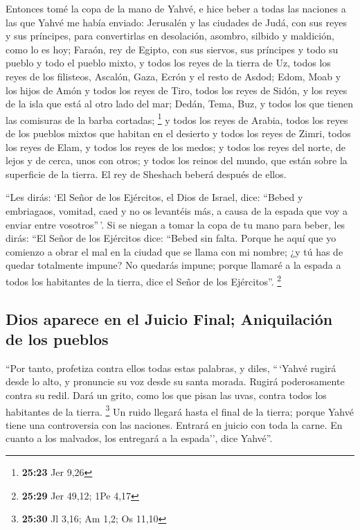 \begin{paracol}{2}
 Entonces tomé la copa de la mano de Yahvé, e hice beber
a todas las naciones a las que Yahvé me había enviado: 
Jerusalén y las ciudades de Judá, con sus reyes y sus príncipes, para
convertirlas en desolación, asombro, silbido y maldición, como lo es
hoy;  Faraón, rey de Egipto, con sus siervos, sus
príncipes y todo su pueblo  y todo el pueblo mixto, y
todos los reyes de la tierra de Uz, todos los reyes de los filisteos,
Ascalón, Gaza, Ecrón y el resto de Asdod;  Edom, Moab y
los hijos de Amón  y todos los reyes de Tiro, todos los
reyes de Sidón, y los reyes de la isla que está al otro lado del mar;
 Dedán, Tema, Buz, y todos los que tienen las comisuras
de la barba cortadas; \footnote{\textbf{25:23} Jer 9,26} 
y todos los reyes de Arabia, todos los reyes de los pueblos mixtos que
habitan en el desierto  y todos los reyes de Zimri, todos
los reyes de Elam, y todos los reyes de los medos;  y
todos los reyes del norte, de lejos y de cerca, unos con otros; y todos
los reinos del mundo, que están sobre la superficie de la tierra. El rey
de Sheshach beberá después de ellos.

 ``Les dirás: `El Señor de los Ejércitos, el Dios de
Israel, dice: ``Bebed y embriagaos, vomitad, caed y no os levantéis más,
a causa de la espada que voy a enviar entre vosotros''\,'.
 Si se niegan a tomar la copa de tu mano para beber, les
dirás: ``El Señor de los Ejércitos dice: ``Bebed sin falta.
 Porque he aquí que yo comienzo a obrar el mal en la
ciudad que se llama con mi nombre; ¿y tú has de quedar totalmente
impune? No quedarás impune; porque llamaré a la espada a todos los
habitantes de la tierra, dice el Señor de los Ejércitos''. \footnote{\textbf{25:29}
  Jer 49,12; 1Pe 4,17}

\hypertarget{dios-aparece-en-el-juicio-final-aniquilaciuxf3n-de-los-pueblos}{%
\subsection{Dios aparece en el Juicio Final; Aniquilación de los
pueblos}\label{dios-aparece-en-el-juicio-final-aniquilaciuxf3n-de-los-pueblos}}

 ``Por tanto, profetiza contra ellos todas estas
palabras, y diles, ``\,`Yahvé rugirá desde lo alto, y pronuncie su voz
desde su santa morada. Rugirá poderosamente contra su redil. Dará un
grito, como los que pisan las uvas, contra todos los habitantes de la
tierra. \footnote{\textbf{25:30} Jl 3,16; Am 1,2; Os 11,10}
 Un ruido llegará hasta el final de la tierra; porque
Yahvé tiene una controversia con las naciones. Entrará en juicio con
toda la carne. En cuanto a los malvados, los entregará a la espada'',
dice Yahvé''.


\end{paracol}
